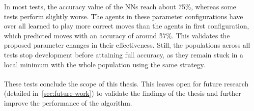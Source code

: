 \begin{figure}[H]
\begin{adjustbox}{valign=c,margin=-5mm 0pt 0pt 0pt}
\begin{minipage}{1.1\textwidth}
\begin{subfigure}[b]{0.45\textwidth}
                \begin{center}
                \end{center}
            \end{subfigure}
        \end{minipage}
    \end{adjustbox}
    \label{fig:performances-3}
\end{figure}

In most tests, the accuracy value of the NNs reach about 75\%, whereas some tests perform slightly worse.
The agents in these parameter configurations have over all learned to play more correct moves than the agents in first configuration, which predicted moves with an accuracy of around 5̃7\%.
This validates the proposed parameter changes in their effectiveness.
Still, the populations across all tests stop development before attaining full accuracy, as they remain stuck in a local minimum with the whole population using the same strategy.
\\ \\
These tests conclude the scope of this thesis.
This leaves open for future research (detailed in~\ref{sec:future-work}) to validate the findings of the thesis and further improve the performance of the algorithm.
